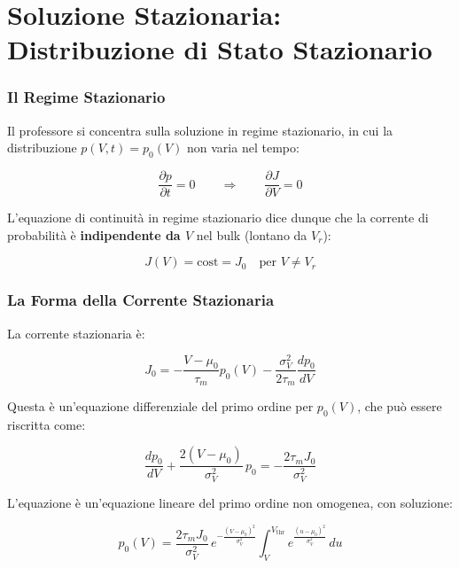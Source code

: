 \section{Soluzione Stazionaria: Distribuzione di Stato Stazionario}

\subsubsection{Il Regime Stazionario}

Il professore si concentra sulla soluzione in regime stazionario, in cui la distribuzione $p(V, t) = p_0(V)$ non varia nel tempo:

\begin{equation}
\frac{\partial p}{\partial t} = 0 \qquad \Rightarrow \qquad \frac{\partial J}{\partial V} = 0
\end{equation}

L'equazione di continuità in regime stazionario dice dunque che la corrente di probabilità è \textbf{indipendente da $V$} nel bulk (lontano da $V_r$):

\begin{equation}
J(V) = \text{cost} = J_0 \quad \text{per } V \neq V_r
\end{equation}

\subsubsection{La Forma della Corrente Stazionaria}

La corrente stazionaria è:

\begin{equation}
J_0 = -\frac{V - \mu_0}{\tau_m} p_0(V) - \frac{\sigma_V^2}{2\tau_m} \frac{dp_0}{dV}
\end{equation}

Questa è un'equazione differenziale del primo ordine per $p_0(V)$, che può essere riscritta come:

\begin{equation}
\frac{dp_0}{dV} + \frac{2(V - \mu_0)}{\sigma_V^2}\, p_0 = -\frac{2\tau_m J_0}{\sigma_V^2}
\end{equation}

L'equazione è un'equazione lineare del primo ordine non omogenea, con soluzione:

\begin{equation}
p_0(V) = \frac{2\tau_m J_0}{\sigma_V^2}\, e^{-\frac{(V - \mu_0)^2}{\sigma_V^2}} \int_{V}^{V_{\text{thr}}} e^{\frac{(u - \mu_0)^2}{\sigma_V^2}}\, du
\end{equation}

